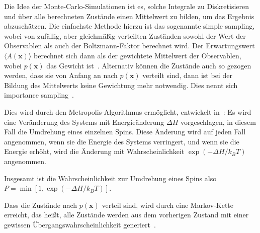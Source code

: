 	Die Idee der Monte-Carlo-Simulationen ist es, solche Integrale zu Diskretisieren
	und über alle berechneten Zustände einen Mittelwert zu bilden, um das Ergebnis abzuschätzen. 
	Die einfachste Methode hierzu ist das sogenannte simple sampling, wobei von zufällig, aber gleichmäßig verteilten Zuständen sowohl der Wert der Observablen als auch der Boltzmann-Faktor berechnet wird. Der Erwartungswert $\langle A(\mathbf{x}) \rangle$ berechnet sich dann als der gewichtete Mittelwert der Observablen, wobei $p(\mathbf{x})$ das Gewicht ist~\cite[vgl. ][S. 9 f.]{binderheermann}.
	 Alternativ können die Zustände auch so gezogen werden, dass sie von Anfang an nach $p(\mathbf{x})$ verteilt sind, dann ist bei der Bildung des Mittelwerts keine Gewichtung mehr notwendig. Dies nennt sich importance sampling~\cite[vgl. ][S. 19 f.]{binderheermann}.
	
	Dies wird durch den Metropolis-Algorithmus ermöglicht, entwickelt in~\cite{metropolisupdate}:
	Es wird eine Veränderung des Systems mit Energieänderung $\Delta H$ vorgeschlagen, in diesem Fall die Umdrehung eines einzelnen Spins. Diese Änderung wird auf jeden Fall angenommen, wenn sie die Energie des Systems verringert, und wenn sie die Energie erhöht, wird die Änderung mit Wahrscheinlichkeit $\exp(-\Delta H/k_BT)$ angenommen.
	
	Insgesamt ist die Wahrscheinlichkeit zur Umdrehung eines Spins also $P=\min \left[1, \exp(-\Delta H/k_BT)\right]$.
	
	Dass die Zustände nach $p(\mathbf{x})$ verteil sind, wird durch eine Markov-Kette erreicht, das heißt, alle Zustände werden aus dem vorherigen Zustand mit einer gewissen Übergangswahrscheinlichkeit generiert~\cite[vgl. ][S. 19 f.]{binderheermann}. 
	
